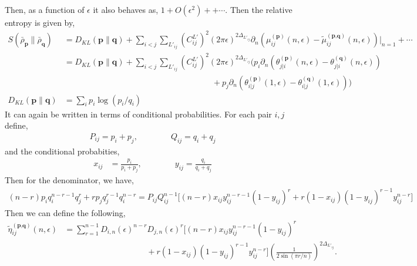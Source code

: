 \documentclass[11pt]{article}
\newcommand{\ep}{\epsilon}
\newcommand{\p}{\partial}
\newcommand{\nn}{\nonumber}
\newcommand{\lb}{\left(}
\newcommand{\rb}{\right)}
\begin{document}
Then, as a function of $\ep$ it also behaves as, 
$1+ O(\ep^2) ++ \cdots$. 
Then the relative entropy is given by,
\begin{align}
    S(\bar{\rho}_\textbf{p}\| \bar{\rho}_\textbf{q}) &= D_{KL}(\textbf{p}\|\textbf{q}) +  \sum_{i<j}\sum_{L'_{ij}}\lb C_{ij}^{L'}\rb^2 (2\pi\ep)^{2\Delta_{L'_{ij}}} \p_n \lb\mu_{ij}^{(\textbf{p})}(n,\ep)- \tilde{\mu}_{ij}^{(\textbf{p,q})}(n,\ep)\rb\Big|_{n=1}+\cdots\\
    &= D_{KL}(\textbf{p}\|\textbf{q}) + \sum_{i<j}\sum_{L'_{ij}}\lb C_{ij}^{L'}\rb^2 (2\pi\ep)^{2\Delta_{L'_{ij}}} \Bigg(p_i \p_n \lb  \theta_{j|i}^{(\textbf{p})} (n,\ep)-\theta_{j|i}^{(\textbf{q})} (n,\ep )\rb 
    \nn\\
    &\qquad \qquad\qquad \qquad \qquad\qquad \qquad\qquad\qquad  
    + p_j\p_n \lb\theta_{i|j}^{(\textbf{p})} (1,\ep )-\theta_{i|j}^{(\textbf{q})} (1,\ep )\rb \Bigg)\\
     D_{KL}(\textbf{p}\|\textbf{q}) &= \sum_i p_i \log(p_i/q_i) 
\end{align}
It can again be written in terms of conditional probabilities. For each pair $i,j$ define,
\begin{align}
    P_{ij} = p_i + p_j, \qquad \qquad Q_{ij} = q_i + q_j
\end{align}
and the conditional probabities,
\begin{align}
    x_{ij} &= \frac{p_i}{p_i + p_j}, \qquad \qquad y_{ij} = \frac{q_i}{q_i + q_j}
\end{align}
Then for the denominator, we have,
\begin{align}
    (n-r)p_i q_i^{n-r-1}q_j^r + rp_j q_j^{r-1}q_i^{n-r} = P_{ij} Q_{ij}^{n-1}\big[ (n-r)x_{ij}y_{ij}^{n-r-1}(1-y_{ij})^r + r(1-x_{ij}) (1-y_{ij})^{r-1}y_{ij}^{n-r} \big]
\end{align}
Then we can define the following,
\begin{align}
    \tilde\eta_{ij}^{(\textbf{p,q})}(n,\ep) &= 
    \sum_{r=1}^{n-1} D_{i,n}(\ep)^{n-r}D_{j,n}(\ep)^r\Big[ (n-r)x_{ij}y_{ij}^{n-r-1}(1-y_{ij})^r \nn\\&\qquad \qquad\qquad\qquad\qquad + r(1-x_{ij}) (1-y_{ij})^{r-1}y_{ij}^{n-r} \Big] \lb\frac{1}{2\sin (\pi r/n)}\rb^{2\Delta_{L'_{ij}}} .
\end{align}
\end{document}
